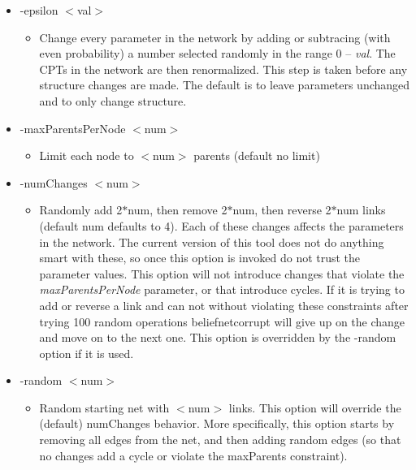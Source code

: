 \begin{itemize}
\item -epsilon $<$val$>$\begin{itemize}
\item Change every parameter in the network by adding or subtracing (with even probability) a number selected randomly in the range 0 -- {\em val\/}. The CPTs in the network are then renormalized. This step is taken before any structure changes are made. The default is to leave parameters unchanged and to only change structure.\end{itemize}
\end{itemize}


\begin{itemize}
\item -max\-Parents\-Per\-Node $<$num$>$\begin{itemize}
\item Limit each node to $<$num$>$ parents (default no limit)\end{itemize}
\end{itemize}


\begin{itemize}
\item -num\-Changes $<$num$>$\begin{itemize}
\item Randomly add 2$\ast$num, then remove 2$\ast$num, then reverse 2$\ast$num links (default num defaults to 4). Each of these changes affects the parameters in the network. The current version of this tool does not do anything smart with these, so once this option is invoked do not trust the parameter values. This option will not introduce changes that violate the {\em max\-Parents\-Per\-Node\/} parameter, or that introduce cycles. If it is trying to add or reverse a link and can not without violating these constraints after trying 100 random operations beliefnetcorrupt will give up on the change and move on to the next one. This option is overridden by the -random option if it is used.\end{itemize}
\end{itemize}


\begin{itemize}
\item -random $<$num$>$\begin{itemize}
\item Random starting net with $<$num$>$ links. This option will override the (default) num\-Changes behavior. More specifically, this option starts by removing all edges from the net, and then adding random edges (so that no changes add a cycle or violate the max\-Parents constraint).\end{itemize}
\end{itemize}



